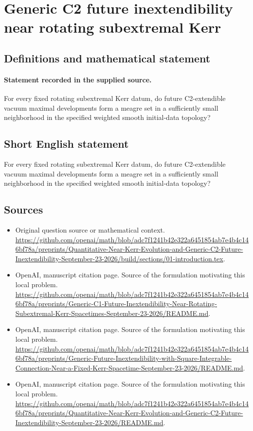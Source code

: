 \documentclass[11pt]{article}
\begin{document}
\section*{Generic C2 future inextendibility near rotating subextremal Kerr}\label{30007237}
\subsection{Definitions and mathematical statement}
\paragraph{Statement recorded in the supplied source.}
For every fixed rotating subextremal Kerr datum, do future C2-extendible vacuum maximal developments form a meagre set in a sufficiently small neighborhood in the specified weighted smooth initial-data topology?
\subsection{Short English statement}
For every fixed rotating subextremal Kerr datum, do future C2-extendible vacuum maximal developments form a meagre set in a sufficiently small neighborhood in the specified weighted smooth initial-data topology?
\subsection{Sources}
\begin{itemize}
\item[S1] Original question source or mathematical context.
\url{https://github.com/openai/math/blob/adc7f1241b42e322a6451854ab7e4b4c146bf78a/preprints/Quantitative-Near-Kerr-Evolution-and-Generic-C2-Future-Inextendibility-September-23-2026/build/sections/01-introduction.tex}.
\item[S2] OpenAI, manuscript citation page. Source of the formulation motivating this local problem.
\url{https://github.com/openai/math/blob/adc7f1241b42e322a6451854ab7e4b4c146bf78a/preprints/Generic-C1-Future-Inextendibility-Near-Rotating-Subextremal-Kerr-Spacetimes-September-23-2026/README.md}.
\item[S3] OpenAI, manuscript citation page. Source of the formulation motivating this local problem.
\url{https://github.com/openai/math/blob/adc7f1241b42e322a6451854ab7e4b4c146bf78a/preprints/Generic-Future-Inextendibility-with-Square-Integrable-Connection-Near-a-Fixed-Kerr-Spacetime-September-23-2026/README.md}.
\item[S4] OpenAI, manuscript citation page. Source of the formulation motivating this local problem.
\url{https://github.com/openai/math/blob/adc7f1241b42e322a6451854ab7e4b4c146bf78a/preprints/Quantitative-Near-Kerr-Evolution-and-Generic-C2-Future-Inextendibility-September-23-2026/README.md}.
\end{itemize}
\end{document}
